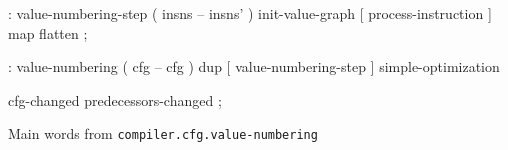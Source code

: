 \centering

  \begin{factorcode}
    : value-numbering-step ( insns -- insns' )
        init-value-graph
        [ process-instruction ] map flatten ;

    : value-numbering ( cfg -- cfg )
        dup [ value-numbering-step ] simple-optimization

        cfg-changed predecessors-changed ;
  \end{factorcode}

\caption{Main words from \texttt{compiler.cfg.value-numbering}}
